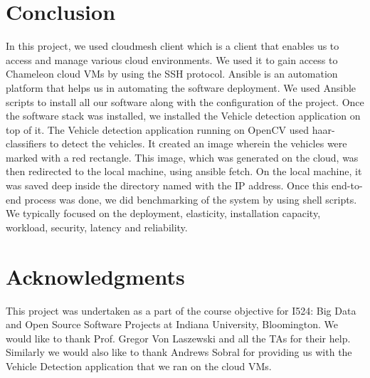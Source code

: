 \documentclass[9pt,twocolumn,twoside]{../../styles/osajnl}
\begin{document}
\section{Conclusion}
In this project, we used cloudmesh client which is a client that
enables us to access and manage various cloud environments.  We used
it to gain access to Chameleon cloud VMs by using the SSH protocol.
Ansible is an automation platform that helps us in automating the
software deployment.  We used Ansible scripts to install all our
software along with the configuration of the project.  Once the
software stack was installed, we installed the Vehicle detection
application on top of it.  The Vehicle detection application running
on OpenCV used haar-classifiers to detect the vehicles.  It created an image wherein the vehicles were marked with a red rectangle.  This image, which was generated on the cloud, was then redirected to the local machine, using ansible fetch.  On the local machine, it was saved deep inside the directory named with the IP address.  Once this end-to-end process was
done, we did benchmarking of the system by using shell scripts.  We typically focused on the
deployment, elasticity, installation capacity, workload, security,
latency and reliability.

\section{Acknowledgments}
This project was undertaken as a part of the course objective for
I524: Big Data and Open Source Software Projects at Indiana
University, Bloomington.  We would like to thank Prof. Gregor Von
Laszewski and all the TAs for their help.  Similarly we would also
like to thank Andrews Sobral for providing us with the Vehicle
Detection application that we ran on the cloud VMs.


\end{document}
